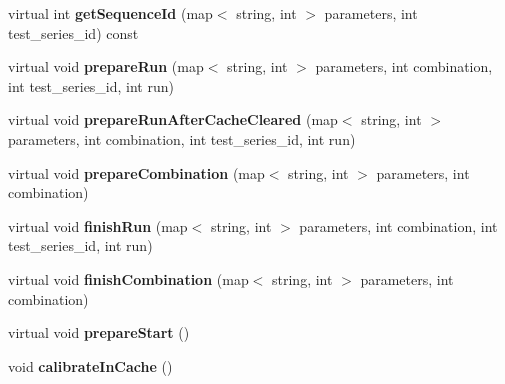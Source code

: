 \begin{DoxyCompactItemize}
\item 
\hypertarget{classAbstractBenchmark_a2105f393176a8cf75f7e96cf5137588c}{virtual int {\bfseries get\-Sequence\-Id} (map$<$ string, int $>$ parameters, int test\-\_\-series\-\_\-id) const }\label{classAbstractBenchmark_a2105f393176a8cf75f7e96cf5137588c}

\item 
\hypertarget{classAbstractBenchmark_a795a91773867332fb2be6a5e8839f561}{virtual void {\bfseries prepare\-Run} (map$<$ string, int $>$ parameters, int combination, int test\-\_\-series\-\_\-id, int run)}\label{classAbstractBenchmark_a795a91773867332fb2be6a5e8839f561}

\item 
\hypertarget{classAbstractBenchmark_acce4ed77b6d8ee8f59001a4e7e54667c}{virtual void {\bfseries prepare\-Run\-After\-Cache\-Cleared} (map$<$ string, int $>$ parameters, int combination, int test\-\_\-series\-\_\-id, int run)}\label{classAbstractBenchmark_acce4ed77b6d8ee8f59001a4e7e54667c}

\item 
\hypertarget{classAbstractBenchmark_a911f5befcceb6c68ea095ba330873c3b}{virtual void {\bfseries prepare\-Combination} (map$<$ string, int $>$ parameters, int combination)}\label{classAbstractBenchmark_a911f5befcceb6c68ea095ba330873c3b}

\item 
\hypertarget{classAbstractBenchmark_a95ff8f86618d1eac03c1b0c04cfd3a26}{virtual void {\bfseries finish\-Run} (map$<$ string, int $>$ parameters, int combination, int test\-\_\-series\-\_\-id, int run)}\label{classAbstractBenchmark_a95ff8f86618d1eac03c1b0c04cfd3a26}

\item 
\hypertarget{classAbstractBenchmark_a786b07ee2d6fd266e4c2e4ef551d1def}{virtual void {\bfseries finish\-Combination} (map$<$ string, int $>$ parameters, int combination)}\label{classAbstractBenchmark_a786b07ee2d6fd266e4c2e4ef551d1def}

\item 
\hypertarget{classAbstractBenchmark_ae46000a1ea741931fd70504a0109ca00}{virtual void {\bfseries prepare\-Start} ()}\label{classAbstractBenchmark_ae46000a1ea741931fd70504a0109ca00}

\item 
\hypertarget{classAbstractBenchmark_a8519ee959df8dcd3173ef6ede535b6f7}{void {\bfseries calibrate\-In\-Cache} ()}\label{classAbstractBenchmark_a8519ee959df8dcd3173ef6ede535b6f7}

\end{DoxyCompactItemize}
